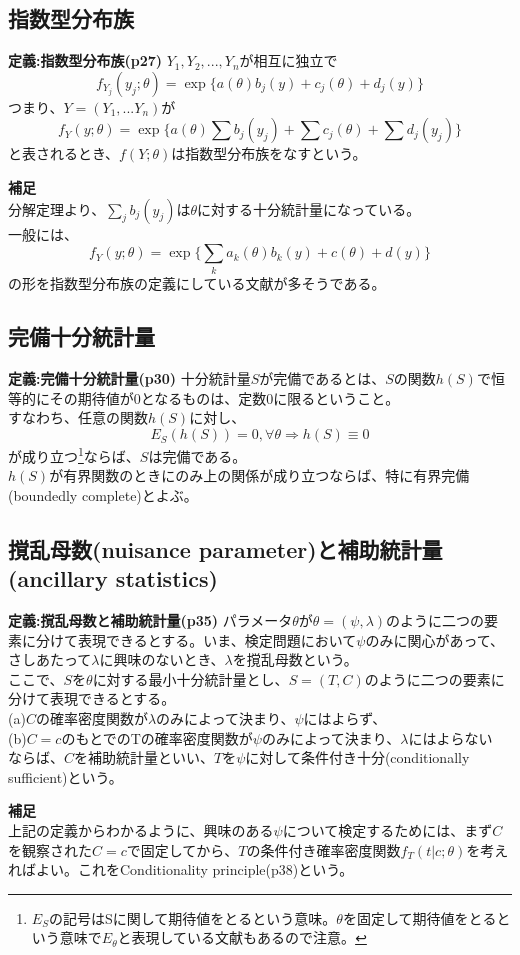 \documentclass[10pt]{jarticle}
\begin{document}
\subsection{指数型分布族}
\begin{itembox}[l]{\textbf{定義:指数型分布族(p27)}}
$Y_1,Y_2,...,Y_n$が相互に独立で
\[f_{Y_j}(y_j;\theta)=\exp\{a(\theta)b_j(y)+c_j(\theta)+d_j(y)\}\]
つまり、$Y=(Y_1,...Y_n)$が
\[f_{Y}(y;\theta)=\exp\{a(\theta)\sum b_j(y_j)+\sum c_j(\theta)+\sum d_j(y_j)\}\]
と表されるとき、$f(Y;\theta)$は指数型分布族をなすという。
\end{itembox}
\textbf{補足}\\
分解定理より、$\sum_{j}b_j(y_j)$は$\theta$に対する十分統計量になっている。\\
一般には、\[f_Y(y;\theta)=\exp\{\sum_{k}a_k(\theta)b_k(y)+c(\theta)+d(y)\}\]
の形を指数型分布族の定義にしている文献が多そうである。

\subsection{完備十分統計量}
\begin{itembox}[l]{\textbf{定義:完備十分統計量(p30)}}
十分統計量$S$が完備であるとは、$S$の関数$h(S)$で恒等的にその期待値が$0$となるものは、定数$0$に限るということ。\\すなわち、任意の関数$h(S)$に対し、
\[E_S(h(S))=0,\forall\theta\Longrightarrow h(S)\equiv0\]
が成り立つ\footnote{$E_S$の記号はSに関して期待値をとるという意味。$\theta$を固定して期待値をとるという意味で$E_\theta$と表現している文献もあるので注意。}ならば、$S$は完備である。\\
$h(S)$が有界関数のときにのみ上の関係が成り立つならば、特に有界完備(boundedly complete)とよぶ。
\end{itembox}


\subsection{撹乱母数(nuisance parameter)と補助統計量(ancillary statistics)}
\begin{itembox}[l]{\textbf{定義:撹乱母数と補助統計量(p35)}}
パラメータ$\theta$が$\theta=(\psi,\lambda)$のように二つの要素に分けて表現できるとする。いま、検定問題において$\psi$のみに関心があって、さしあたって$\lambda$に興味のないとき、$\lambda$を撹乱母数という。\\
ここで、$S$を$\theta$に対する最小十分統計量とし、$S=(T,C)$のように二つの要素に分けて表現できるとする。\\
(a)$C$の確率密度関数が$\lambda$のみによって決まり、$\psi$にはよらず、\\
(b)$C=c$のもとでのTの確率密度関数が$\psi$のみによって決まり、$\lambda$にはよらない\\
ならば、$C$を補助統計量といい、$T$を$\psi$に対して条件付き十分(conditionally sufficient)という。
\end{itembox}
\textbf{補足}\\
上記の定義からわかるように、興味のある$\psi$について検定するためには、まず$C$を観察された$C=c$で固定してから、$T$の条件付き確率密度関数$f_T(t|c;\theta)$を考えればよい。これをConditionality principle(p38)という。
\end{document}
